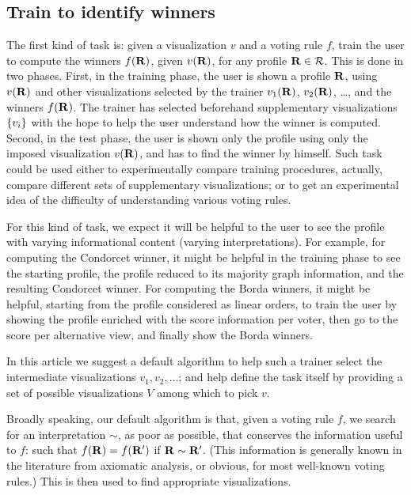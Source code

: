 \documentclass[version=last, pagesize, twoside=off, bibliography=totoc, DIV=calc, fontsize=12pt, a4paper, french, english]{scrartcl}
\begin{document}
\subsection{Train to identify winners}
The first kind of task is: given a visualization $v$ and a voting rule $f$, train the user to compute the winners $f(\mathbf{R})$, given $v(\mathbf{R})$, for any profile $\mathbf{R} \in \mathcal{R}$. This is done in two phases. First, in the training phase, the user is shown a profile $\mathbf{R}$, using $v(\mathbf{R})$ and other visualizations selected by the trainer $v_1(\mathbf{R})$, $v_2(\mathbf{R})$, …, and the winners $f(\mathbf{R})$. The trainer has selected beforehand supplementary visualizations $\left\{v_i\right\}$ with the hope to help the user understand how the winner is computed. Second, in the test phase, the user is shown only the profile using only the imposed visualization $v(\mathbf{R})$, and has to find the winner by himself. Such task could be used either to experimentally compare training procedures, actually, compare different sets of supplementary visualizations; or to get an experimental idea of the difficulty of understanding various voting rules.

For this kind of task, we expect it will be helpful to the user to see the profile with varying informational content (varying interpretations). For example, for computing the Condorcet winner, it might be helpful in the training phase to see the starting profile, the profile reduced to its majority graph information, and the resulting Condorcet winner. For computing the Borda winners, it might be helpful, starting from the profile considered as linear orders, to train the user by showing the profile enriched with the score information per voter, then go to the score per alternative view, and finally show the Borda winners.

In this article we suggest a default algorithm to help such a trainer select the intermediate visualizations $v_1, v_2, …$; and help define the task itself by providing a set of possible visualizations $V$ among which to pick $v$.

Broadly speaking, our default algorithm is that, given a voting rule $f$, we search for an interpretation $\sim$, as poor as possible, that conserves the information useful to $f$: such that $f(\mathbf{R}) = f(\mathbf{R}')$ if $\mathbf{R} \sim \mathbf{R}'$. (This information is generally known in the literature from axiomatic analysis, or obvious, for most well-known voting rules.) This is then used to find appropriate visualizations.
\end{document}
